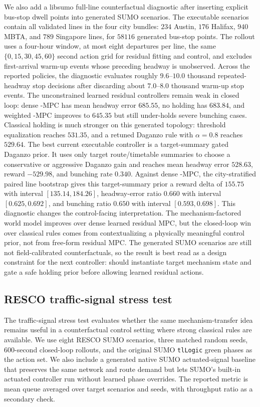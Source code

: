 We also add a libsumo full-line counterfactual diagnostic after inserting explicit bus-stop dwell points into generated SUMO scenarios.
The executable scenarios contain all validated lines in the four city bundles: $234$ Austin, $176$ Halifax, $940$ MBTA, and $789$ Singapore lines, for $58116$ generated bus-stop points.
The rollout uses a four-hour window, at most eight departures per line, the same $\{0,15,30,45,60\}$ second action grid for residual fitting and control, and excludes first-arrival warm-up events whose preceding headway is unobserved.
Across the reported policies, the diagnostic evaluates roughly $9.6$--$10.0$ thousand repeated-headway stop decisions after discarding about $7.0$--$8.0$ thousand warm-up stop events.
The unconstrained learned residual controllers remain weak in closed loop: dense \Htwo-MPC has mean headway error $685.55$, no holding has $683.84$, and weighted \ours-MPC improves to $645.35$ but still under-holds severe bunching cases.
Classical holding is much stronger on this generated topology: threshold equalization reaches $531.35$, and a retuned Daganzo rule with $\alpha=0.8$ reaches $529.64$.
The best current executable controller is a target-summary gated Daganzo prior.
It uses only target route/timetable summaries to choose a conservative or aggressive Daganzo gain and reaches mean headway error $528.63$, reward $-529.98$, and bunching rate $0.340$.
Against dense \Htwo-MPC, the city-stratified paired line bootstrap gives this target-summary prior a reward delta of $155.75$ with interval $[135.14,184.26]$, headway-error ratio $0.660$ with interval $[0.625,0.692]$, and bunching ratio $0.650$ with interval $[0.593,0.698]$.
This diagnostic changes the control-facing interpretation.
The mechanism-factored world model improves over dense learned residual MPC, but the closed-loop win over classical rules comes from contextualizing a physically meaningful control prior, not from free-form residual MPC.
The generated SUMO scenarios are still not field-calibrated counterfactuals, so the result is best read as a design constraint for the next controller: \ours should instantiate target mechanism state and gate a safe holding prior before allowing learned residual actions.

\subsection{RESCO traffic-signal stress test}

The traffic-signal stress test evaluates whether the same mechanism-transfer idea remains useful in a counterfactual control setting where strong classical rules are available.
We use eight RESCO SUMO scenarios, three matched random seeds, 600-second closed-loop rollouts, and the original SUMO \texttt{tlLogic} green phases as the action set.
We also include a generated native SUMO actuated-signal baseline that preserves the same network and route demand but lets SUMO's built-in actuated controller run without learned phase overrides.
The reported metric is mean queue averaged over target scenarios and seeds, with throughput ratio as a secondary check.

